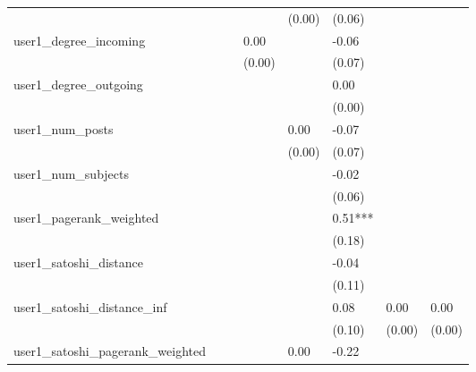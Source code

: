 \begin{table}
\begin{center}
\begin{tabular}{llllllll}
                                               &         &         &         & (0.00)  & (0.06)   &           &          \\
user1_degree_incoming                          &         &         & 0.00    &         & -0.06    &           &          \\
                                               &         &         & (0.00)  &         & (0.07)   &           &          \\
user1_degree_outgoing                          &         &         &         &         & 0.00     &           &          \\
                                               &         &         &         &         & (0.00)   &           &          \\
user1_num_posts                                &         &         &         & 0.00    & -0.07    &           &          \\
                                               &         &         &         & (0.00)  & (0.07)   &           &          \\
user1_num_subjects                             &         &         &         &         & -0.02    &           &          \\
                                               &         &         &         &         & (0.06)   &           &          \\
user1_pagerank_weighted                        &         &         &         &         & 0.51***  &           &          \\
                                               &         &         &         &         & (0.18)   &           &          \\
user1_satoshi_distance                         &         &         &         &         & -0.04    &           &          \\
                                               &         &         &         &         & (0.11)   &           &          \\
user1_satoshi_distance_inf                     &         &         &         &         & 0.08     & 0.00      & 0.00     \\
                                               &         &         &         &         & (0.10)   & (0.00)    & (0.00)   \\
user1_satoshi_pagerank_weighted                &         &         &         & 0.00    & -0.22    &           &          \\

\end{tabular}
\end{center}
\end{table}
